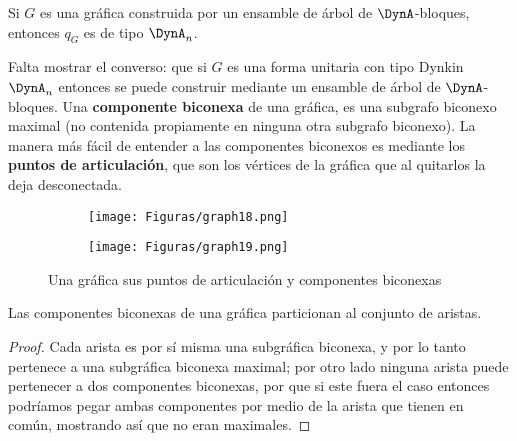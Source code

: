 \begin{lemma}
Si $G$ es una gráfica construida por un ensamble de árbol de $\DynA$-bloques, entonces $q_{G}$ es de tipo $\DynA_{n}$.
\label{lemma:2.10}
\end{lemma}

Falta mostrar el converso: que si $G$ es una forma unitaria con tipo Dynkin $\DynA_{n}$ entonces se puede construir mediante un ensamble de árbol de $\DynA$-bloques. Una \textbf{componente biconexa} de una gráfica, es una subgrafo biconexo maximal (no contenida propiamente en ninguna otra subgrafo biconexo). La manera más fácil de entender a las componentes biconexos es mediante los \textbf{puntos de articulación}, que son los vértices de la gráfica que al quitarlos la deja desconectada.\\

\begin{figure}[h]
    \begin{subfigure}[b]{0.5\textwidth}
      \begin{minipage}{7cm}
	\centering%
	    \texttt{[image: Figuras/graph18.png]}
	 \end{minipage}
	\caption{}
     \end{subfigure}
     \begin{subfigure}[b]{0.5\textwidth}
        \begin{minipage}{7cm}
       	 \centering%
	    \texttt{[image: Figuras/graph19.png]}
        \end{minipage}
        \caption{}
     \end{subfigure}
     \caption{Una gráfica sus puntos de articulación y componentes biconexas}
    \label{figura:2.9}
\end{figure}

\begin{lemma}
Las componentes biconexas de una gráfica particionan al conjunto de aristas.
\label{lemma:2.11}
\end{lemma}

\begin{proof}
Cada arista es por sí misma una subgráfica biconexa, y por lo tanto pertenece a una subgráfica biconexa maximal; por otro lado ninguna arista puede pertenecer a dos componentes biconexas, por que si este fuera el caso entonces podríamos pegar ambas componentes por medio de la arista que tienen en común, mostrando así que no eran maximales.
\end{proof}

